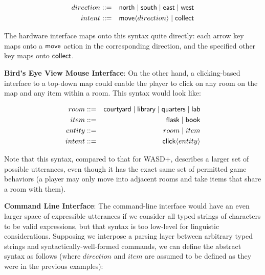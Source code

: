   \begin{eqnarray*}
  direction &::=& \mathsf{north} \mid \mathsf{south} \mid \mathsf{east}
    \mid \mathsf{west} \\
  intent &::=& \mathsf{move} \langle direction \rangle \mid \mathsf{collect}
  \end{eqnarray*}

  The hardware interface maps onto this syntax quite directly:
  each arrow key maps onto a $\mathsf{move}$ action in the corresponding
  direction, and the specified other key maps onto $\mathsf{collect}$.

  \textbf{Bird's Eye View Mouse Interface}:
  On the other hand, a clicking-based interface to a top-down map could
  enable the player to click on any room on the map and any item within a
  room. This syntax would look like:

  \begin{eqnarray*}
    room   &::=& \mathsf{courtyard} \mid \mathsf{library} \mid \mathsf{quarters}
              \mid \mathsf{lab}\\
    item   &::=& \mathsf{flask} \mid \mathsf{book}\\
    entity &::=& room \mid item\\
    intent &::=& \mathsf{click}\langle entity \rangle
  \end{eqnarray*}

  Note that this syntax, compared to that for WASD+, describes a larger set
  of possible utterances, even though it has the exact same set of
  permitted game behaviors (a player may only move into adjacent rooms and
  take items that share a room with them). 


  \textbf{Command Line Interface}:
  The command-line interface would have an even larger space of expressible
  utterances if we consider all typed strings of characters to be valid
  expressions, but that syntax is too low-level for linguistic
  considerations. Supposing we interpose a parsing layer between arbitrary
  typed strings and syntactically-well-formed commands, we can define the
  abstract syntax as follows (where $direction$ and $item$ are assumed to
  be defined as they were in the previous examples):

